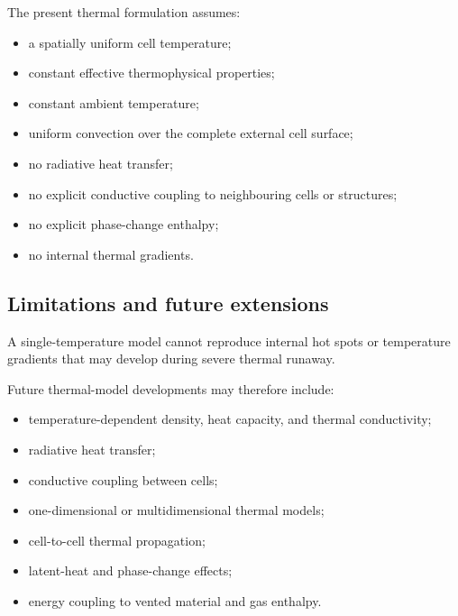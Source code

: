 The present thermal formulation assumes:

\begin{itemize}
    \item a spatially uniform cell temperature;
    \item constant effective thermophysical properties;
    \item constant ambient temperature;
    \item uniform convection over the complete external cell surface;
    \item no radiative heat transfer;
    \item no explicit conductive coupling to neighbouring cells or
          structures;
    \item no explicit phase-change enthalpy;
    \item no internal thermal gradients.
\end{itemize}


\subsection{Limitations and future extensions}

A single-temperature model cannot reproduce internal hot spots or
temperature gradients that may develop during severe thermal runaway.

Future thermal-model developments may therefore include:

\begin{itemize}
    \item temperature-dependent density, heat capacity, and thermal
          conductivity;
    \item radiative heat transfer;
    \item conductive coupling between cells;
    \item one-dimensional or multidimensional thermal models;
    \item cell-to-cell thermal propagation;
    \item latent-heat and phase-change effects;
    \item energy coupling to vented material and gas enthalpy.
\end{itemize}